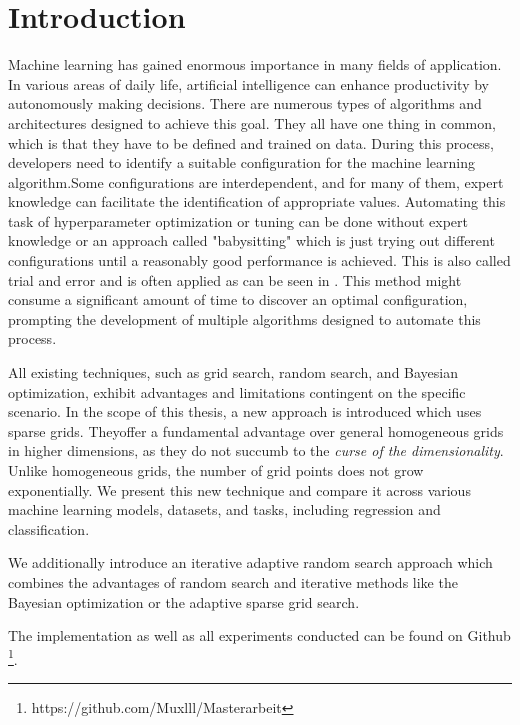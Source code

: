 
\chapter{Introduction}\label{chapter:introduction}

Machine learning has gained enormous importance in many fields of application. In various areas of daily life, artificial intelligence can enhance productivity by autonomously making decisions. There are numerous types of algorithms and architectures designed to achieve this goal. They all have one thing in common, which is that they have to be defined and trained on data. During this process, developers need to identify a suitable configuration for the machine learning algorithm.Some configurations are interdependent, and for many of them, expert knowledge can facilitate the identification of appropriate values. Automating this task of hyperparameter optimization or tuning can be done without expert knowledge or an approach called "babysitting" which is just trying out different configurations until a reasonably good performance is achieved. This is also called trial and error and is often applied as can be seen in \cite{MALAKOUTI2023200248, gorgolis2019hyperparameter}. This method might consume a significant amount of time to discover an optimal configuration, prompting the development of multiple algorithms designed to automate this process. \newline 

All existing techniques, such as grid search, random search, and Bayesian optimization, exhibit advantages and limitations contingent on the specific scenario. In the scope of this thesis, a new approach is introduced which uses sparse grids. Theyoffer a fundamental advantage over general homogeneous grids in higher dimensions, as they do not succumb to the \textit{curse of the dimensionality}. Unlike homogeneous grids, the number of grid points does not grow exponentially. We present this new technique and compare it across various machine learning models, datasets, and tasks, including regression and classification.

We additionally introduce an iterative adaptive random search approach which combines the advantages of random search and iterative methods like the Bayesian optimization or the adaptive sparse grid search. 

The implementation as well as all experiments conducted can be found on Github \footnote{https://github.com/Muxlll/Masterarbeit}. \newline 

